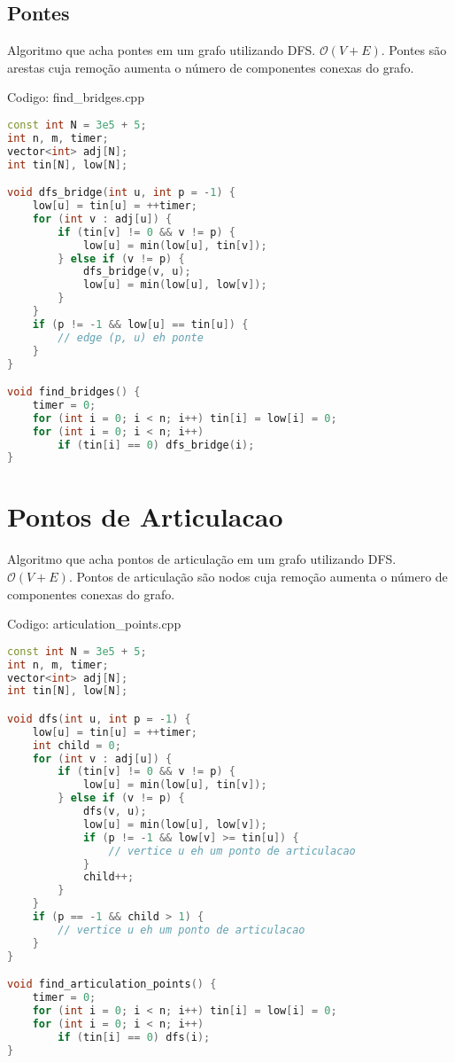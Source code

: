 \documentclass[10pt, a4paper, oneside]{book}
\begin{document}
\subsection{Pontes}


Algoritmo que acha pontes em um grafo utilizando DFS. $\mathcal{O}(V + E)$. Pontes são arestas cuja remoção aumenta o número de componentes conexas do grafo.
\hfill

Codigo: find\_bridges.cpp

\begin{lstlisting}[language=C++]
const int N = 3e5 + 5;
int n, m, timer;
vector<int> adj[N];
int tin[N], low[N];

void dfs_bridge(int u, int p = -1) {
    low[u] = tin[u] = ++timer;
    for (int v : adj[u]) {
        if (tin[v] != 0 && v != p) {
            low[u] = min(low[u], tin[v]);
        } else if (v != p) {
            dfs_bridge(v, u);
            low[u] = min(low[u], low[v]);
        }
    }
    if (p != -1 && low[u] == tin[u]) {
        // edge (p, u) eh ponte
    }
}

void find_bridges() {
    timer = 0;
    for (int i = 0; i < n; i++) tin[i] = low[i] = 0;
    for (int i = 0; i < n; i++)
        if (tin[i] == 0) dfs_bridge(i);
}\end{lstlisting}
\hfill

\section{Pontos de Articulacao}


Algoritmo que acha pontos de articulação em um grafo utilizando DFS. $\mathcal{O}(V + E)$. Pontos de articulação são nodos cuja remoção aumenta o número de componentes conexas do grafo.
\hfill

Codigo: articulation\_points.cpp

\begin{lstlisting}[language=C++]
const int N = 3e5 + 5;
int n, m, timer;
vector<int> adj[N];
int tin[N], low[N];

void dfs(int u, int p = -1) {
    low[u] = tin[u] = ++timer;
    int child = 0;
    for (int v : adj[u]) {
        if (tin[v] != 0 && v != p) {
            low[u] = min(low[u], tin[v]);
        } else if (v != p) {
            dfs(v, u);
            low[u] = min(low[u], low[v]);
            if (p != -1 && low[v] >= tin[u]) {
                // vertice u eh um ponto de articulacao
            }
            child++;
        }
    }
    if (p == -1 && child > 1) {
        // vertice u eh um ponto de articulacao
    }
}

void find_articulation_points() {
    timer = 0;
    for (int i = 0; i < n; i++) tin[i] = low[i] = 0;
    for (int i = 0; i < n; i++)
        if (tin[i] == 0) dfs(i);
}
\end{lstlisting}
\hfill
\end{document}
